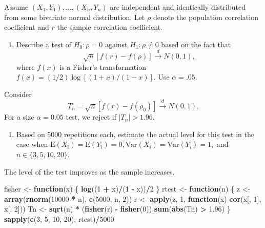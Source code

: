\documentclass[12pt,]{article}
\newenvironment{Shaded}{\begin{snugshade}}{\end{snugshade}}
\newcommand{\ControlFlowTok}[1]{\textcolor[rgb]{0.13,0.29,0.53}{\textbf{#1}}}
\newcommand{\DecValTok}[1]{\textcolor[rgb]{0.00,0.00,0.81}{#1}}
\newcommand{\FloatTok}[1]{\textcolor[rgb]{0.00,0.00,0.81}{#1}}
\newcommand{\KeywordTok}[1]{\textcolor[rgb]{0.13,0.29,0.53}{\textbf{#1}}}
\newcommand{\NormalTok}[1]{#1}
\newcommand{\OperatorTok}[1]{\textcolor[rgb]{0.81,0.36,0.00}{\textbf{#1}}}
\newcommand{\StringTok}[1]{\textcolor[rgb]{0.31,0.60,0.02}{#1}}
\providecommand{\tightlist}{%
  \setlength{\itemsep}{0pt}\setlength{\parskip}{0pt}}
\begin{document}
Assume \((X_1,Y_1),...,(X_n,Y_n)\) are independent and identically
distributed from some bivariate normal distribution. Let \(\rho\) denote
the population correlation coefficient and \(r\) the sample correlation
coefficient.

\begin{enumerate}
\def\labelenumi{(\alph{enumi})}
\tightlist
\item
  Describe a test of \(H_0:\rho=0\) against \(H_1:\rho\ne 0\) based on
  the fact that \[\sqrt{n}[f(r)-f(\rho)]\overset{d}\rightarrow N(0,1),\]
  where \(f(x)\) is a Fisher's transformation
  \(f(x) = (1/2)\log [(1+x)/(1-x)]\). Use \(\alpha = .05\).
\end{enumerate}

Consider
\[T_n = \sqrt{n}[f(r)-f(\rho_0)]\overset{d}\rightarrow N(0,1).\] For a
size \(\alpha = 0.05\) test, we reject if \(|T_n|>1.96.\)

\begin{enumerate}
\def\labelenumi{(\alph{enumi})}
\setcounter{enumi}{1}
\tightlist
\item
  Based on 5000 repetitions each, estimate the actual level for this
  test in the case when
  \(\text{E}(X_i)=\text{E} (Y_i)=0, \text{Var}(X_i)=\text{Var}(Y_i)=1,\)
  and \(n\in\{3,5,10,20\}\).
\end{enumerate}

The level of the test improves as the sample increases.

\begin{Shaded}
\begin{Highlighting}[]
\NormalTok{fisher <-}\StringTok{ }\ControlFlowTok{function}\NormalTok{(x) \{}
    \KeywordTok{log}\NormalTok{((}\DecValTok{1} \OperatorTok{+}\StringTok{ }\NormalTok{x)}\OperatorTok{/}\NormalTok{(}\DecValTok{1} \OperatorTok{-}\StringTok{ }\NormalTok{x))}\OperatorTok{/}\DecValTok{2}
\NormalTok{\}}
\NormalTok{rtest <-}\StringTok{ }\ControlFlowTok{function}\NormalTok{(n) \{}
\NormalTok{    z <-}\StringTok{ }\KeywordTok{array}\NormalTok{(}\KeywordTok{rnorm}\NormalTok{(}\DecValTok{10000} \OperatorTok{*}\StringTok{ }\NormalTok{n), }\KeywordTok{c}\NormalTok{(}\DecValTok{5000}\NormalTok{, n, }\DecValTok{2}\NormalTok{))}
\NormalTok{    r <-}\StringTok{ }\KeywordTok{apply}\NormalTok{(z, }\DecValTok{1}\NormalTok{, }\ControlFlowTok{function}\NormalTok{(x) }\KeywordTok{cor}\NormalTok{(x[, }\DecValTok{1}\NormalTok{], x[, }\DecValTok{2}\NormalTok{]))}
\NormalTok{    Tn <-}\StringTok{ }\KeywordTok{sqrt}\NormalTok{(n) }\OperatorTok{*}\StringTok{ }\NormalTok{(}\KeywordTok{fisher}\NormalTok{(r) }\OperatorTok{-}\StringTok{ }\KeywordTok{fisher}\NormalTok{(}\DecValTok{0}\NormalTok{))}
    \KeywordTok{sum}\NormalTok{(}\KeywordTok{abs}\NormalTok{(Tn) }\OperatorTok{>}\StringTok{ }\FloatTok{1.96}\NormalTok{)}
\NormalTok{\}}
\KeywordTok{sapply}\NormalTok{(}\KeywordTok{c}\NormalTok{(}\DecValTok{3}\NormalTok{, }\DecValTok{5}\NormalTok{, }\DecValTok{10}\NormalTok{, }\DecValTok{20}\NormalTok{), rtest)}\OperatorTok{/}\DecValTok{5000}
\end{Highlighting}
\end{Shaded}
\end{document}
